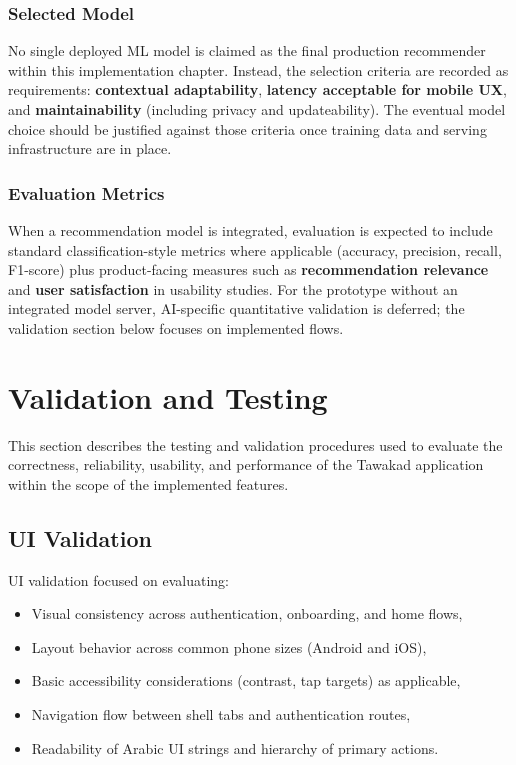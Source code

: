 \subsubsection{Selected Model}

No single deployed ML model is claimed as the final production recommender within this
implementation chapter. Instead, the selection criteria are recorded as requirements:
\textbf{contextual adaptability}, \textbf{latency acceptable for mobile UX}, and
\textbf{maintainability} (including privacy and updateability). The eventual model choice
should be justified against those criteria once training data and serving infrastructure
are in place.

\subsubsection{Evaluation Metrics}

When a recommendation model is integrated, evaluation is expected to include standard
classification-style metrics where applicable (accuracy, precision, recall, F1-score)
plus product-facing measures such as \textbf{recommendation relevance} and
\textbf{user satisfaction} in usability studies. For the prototype without an integrated
model server, AI-specific quantitative validation is deferred; the validation section below
focuses on implemented flows.

\section{Validation and Testing}

This section describes the testing and validation procedures used to evaluate the
correctness, reliability, usability, and performance of the Tawakad application within
the scope of the implemented features.

\subsection{UI Validation}

UI validation focused on evaluating:

\begin{itemize}
    \item Visual consistency across authentication, onboarding, and home flows,
    \item Layout behavior across common phone sizes (Android and iOS),
    \item Basic accessibility considerations (contrast, tap targets) as applicable,
    \item Navigation flow between shell tabs and authentication routes,
    \item Readability of Arabic UI strings and hierarchy of primary actions.
\end{itemize}

